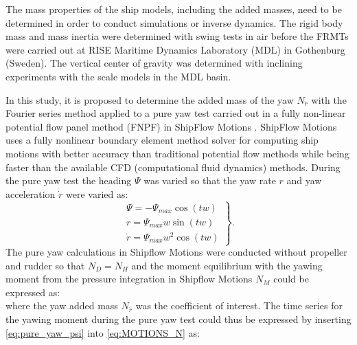 \noindent The mass properties of the ship models, including the added masses, need to be determined in order to conduct simulations or inverse dynamics. The rigid body mass and mass inertia were determined with swing tests in air before the FRMTs were carried out at RISE Maritime Dynamics Laboratory (MDL) in Gothenburg (Sweden). The vertical center of gravity was determined with inclining experiments with the scale models in the MDL basin.

In this study, it is proposed to determine the added mass of the yaw $N_{\dot{r}}$ with the Fourier series method \citep{sakamotoURANSSimulationsStatic2012} applied to a pure yaw test carried out in a fully non-linear potential flow panel method (FNPF) in ShipFlow Motions \citep{kjellbergFullyNonlinearUnsteady2013}.
ShipFlow Motions uses a fully nonlinear boundary element method solver for computing ship motions with better accuracy than traditional potential flow methods while being faster than the available CFD (computational fluid dynamics) methods.
During the pure yaw test the heading $\Psi$ was varied  so that the yaw rate $r$ and yaw acceleration $\dot{r}$ were varied as:
\begin{equation}
    \left.\begin{aligned}
    \Psi = - \Psi_{max} \cos{\left(t w \right)} \\
    r = \Psi_{max} w \sin{\left(t w \right)} \\
    \dot{r} = \Psi_{max} w^{2} \cos{\left(t w \right)}
    \end{aligned}\right\}.
    \label{eq:pure_yaw_psi}
\end{equation}
The pure yaw calculations in Shipflow Motions were conducted without propeller and rudder so that $N_D=N_H$ and the moment equilibrium with the yawing moment from the pressure integration in Shipflow Motions $N_M$ could be expressed as: 
\begin{equation}
    
    \label{eq:MOTIONS_N}
\end{equation}
where the yaw added mass $N_{\dot{r}}$ was the coefficient of interest. 
The time series for the yawing moment during the pure yaw test could thus be expressed by inserting \autoref{eq:pure_yaw_psi}  into \autoref{eq:MOTIONS_N} as:
